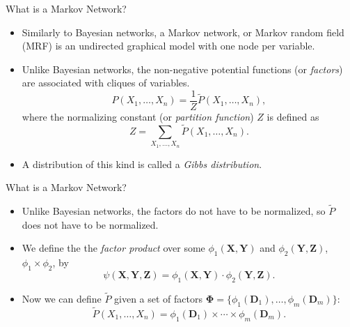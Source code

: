 \documentclass[11pt]{beamer}
\begin{document}
\begin{frame}{What is a Markov Network?}
\begin{itemize}
	\item Similarly to Bayesian networks, a Markov network, or Markov random
	field (MRF) is an undirected graphical model with one node per variable.
	\item Unlike Bayesian networks, the non-negative potential functions (or
	\emph{factors}) are associated with cliques of variables.
	\[
		P(X_{1}, \ldots, X_{n}) = \frac{1}{Z} \tilde{P}(X_{1}, \ldots,
		X_{n}),
	\]
	where the normalizing constant (or \emph{partition function}) $Z$ is
	defined as
	\[
		Z = \sum_{X_{1}, \ldots, X_{n}} \tilde{P}(X_{1}, \ldots, X_{n}).
	\]
	\item A distribution of this kind is called a \emph{Gibbs distribution}.
\end{itemize}
\end{frame}

\begin{frame}{What is a Markov Network?}
\begin{itemize}
	\item Unlike Bayesian networks, the factors do not have to be
	normalized, so $\tilde{P}$ does not have to be normalized.
	\item We define the the \emph{factor product} over some
	$\phi_{1}(\boldsymbol{X}, \boldsymbol{Y})$ and $\phi_{2}(\boldsymbol{Y},
	\boldsymbol{Z})$, $\phi_{1} \times \phi_{2}$, by
	\[
		\psi(\boldsymbol{X}, \boldsymbol{Y}, \boldsymbol{Z}) =
		\phi_{1}(\boldsymbol{X}, \boldsymbol{Y}) \cdot
		\phi_{2}(\boldsymbol{Y}, \boldsymbol{Z}).
	\]
	\item Now we can define $\tilde{P}$ given a set of factors
	$\boldsymbol{\Phi} = \{\phi_{1}(\boldsymbol{D}_{1}), \ldots,
	\phi_{m}(\boldsymbol{D}_{m})\}$:
	\[
		\tilde{P}(X_{1}, \ldots, X_{n}) = \phi_{1}(\boldsymbol{D}_{1})
		\times \cdots \times \phi_{m}(\boldsymbol{D}_{m}).
	\]
\end{itemize}
\end{frame}

\newcommand{\misconceptionmrf}
{
	\begin{tikzpicture}
	\scriptsize
	\node[darkstyle] (a) at (0,1) {$A$};
	\node[darkstyle] (b) at (1,0) {$B$};
	\node[darkstyle] (c) at (0,-1) {$C$};
	\node[darkstyle] (d) at (-1,0) {$D$};
	\draw (a)--(b);
	\draw (b)--(c);
	\draw (c)--(d);
	\draw (d)--(a);
	\end{tikzpicture}
}
\end{document}
